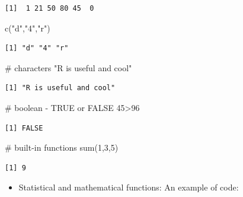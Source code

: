 \documentclass[
  letterpaper,
  DIV=11,
  numbers=noendperiod]{scrreprt}
\newenvironment{Shaded}{\begin{snugshade}}{\end{snugshade}}
\newcommand{\CommentTok}[1]{\textcolor[rgb]{0.37,0.37,0.37}{#1}}
\newcommand{\DecValTok}[1]{\textcolor[rgb]{0.68,0.00,0.00}{#1}}
\newcommand{\FunctionTok}[1]{\textcolor[rgb]{0.28,0.35,0.67}{#1}}
\newcommand{\NormalTok}[1]{\textcolor[rgb]{0.00,0.23,0.31}{#1}}
\newcommand{\SpecialCharTok}[1]{\textcolor[rgb]{0.37,0.37,0.37}{#1}}
\newcommand{\StringTok}[1]{\textcolor[rgb]{0.13,0.47,0.30}{#1}}
\providecommand{\tightlist}{%
  \setlength{\itemsep}{0pt}\setlength{\parskip}{0pt}}\usepackage{longtable,booktabs,array}
\begin{document}
\begin{verbatim}
[1]  1 21 50 80 45  0
\end{verbatim}

\begin{Shaded}
\begin{Highlighting}[]
\FunctionTok{c}\NormalTok{(}\StringTok{"d"}\NormalTok{,}\StringTok{"4"}\NormalTok{,}\StringTok{"r"}\NormalTok{)}
\end{Highlighting}
\end{Shaded}

\begin{verbatim}
[1] "d" "4" "r"
\end{verbatim}

\begin{Shaded}
\begin{Highlighting}[]
\CommentTok{\# characters}
\StringTok{"R is useful and cool"}
\end{Highlighting}
\end{Shaded}

\begin{verbatim}
[1] "R is useful and cool"
\end{verbatim}

\begin{Shaded}
\begin{Highlighting}[]
\CommentTok{\# boolean {-} TRUE or FALSE}
\DecValTok{45}\SpecialCharTok{\textgreater{}}\DecValTok{96}
\end{Highlighting}
\end{Shaded}

\begin{verbatim}
[1] FALSE
\end{verbatim}

\begin{Shaded}
\begin{Highlighting}[]
\CommentTok{\# built{-}in functions}
\FunctionTok{sum}\NormalTok{(}\DecValTok{1}\NormalTok{,}\DecValTok{3}\NormalTok{,}\DecValTok{5}\NormalTok{)}
\end{Highlighting}
\end{Shaded}

\begin{verbatim}
[1] 9
\end{verbatim}

\begin{itemize}
\tightlist
\item
  Statistical and mathematical functions: An example of code:
\end{itemize}
\end{document}
